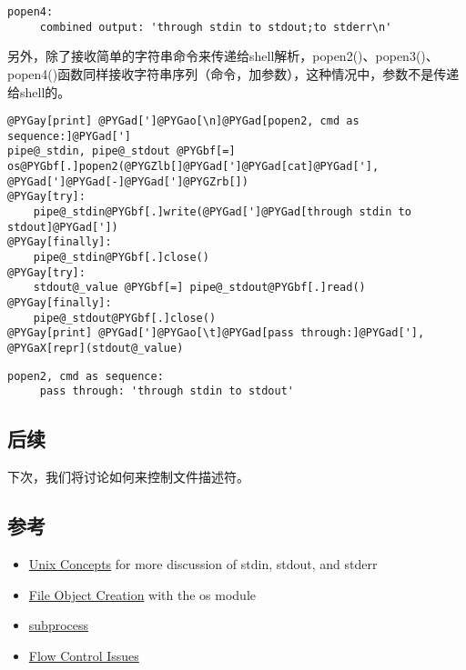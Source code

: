 \documentclass[letterpaper,10pt,english]{manual}
\begin{document}
\begin{Verbatim}[commandchars=@\[\]]
popen4:
     combined output: 'through stdin to stdout;to stderr\n'
\end{Verbatim}

另外，除了接收简单的字符串命令来传递给shell解析，popen2()、popen3()、popen4()函数同样接收字符串序列（命令，加参数），这种情况中，参数不是传递给shell的。

\begin{Verbatim}[commandchars=@\[\]]
@PYGay[print] @PYGad[']@PYGao[\n]@PYGad[popen2, cmd as sequence:]@PYGad[']
pipe@_stdin, pipe@_stdout @PYGbf[=] os@PYGbf[.]popen2(@PYGZlb[]@PYGad[']@PYGad[cat]@PYGad['], @PYGad[']@PYGad[-]@PYGad[']@PYGZrb[])
@PYGay[try]:
    pipe@_stdin@PYGbf[.]write(@PYGad[']@PYGad[through stdin to stdout]@PYGad['])
@PYGay[finally]:
    pipe@_stdin@PYGbf[.]close()
@PYGay[try]:
    stdout@_value @PYGbf[=] pipe@_stdout@PYGbf[.]read()
@PYGay[finally]:
    pipe@_stdout@PYGbf[.]close()
@PYGay[print] @PYGad[']@PYGao[\t]@PYGad[pass through:]@PYGad['], @PYGaX[repr](stdout@_value)
\end{Verbatim}

\begin{Verbatim}[commandchars=@\[\]]
popen2, cmd as sequence:
     pass through: 'through stdin to stdout'
\end{Verbatim}


\subsection{后续}

下次，我们将讨论如何来控制文件描述符。


\subsection{参考}
\begin{itemize}
\item {} 
\href{http://www.linuxhq.com/guides/LUG/node67.html}{Unix Concepts} for more discussion of stdin, stdout, and stderr

\item {} 
\href{http://docs.python.org/lib/os-newstreams.html}{File Object Creation} with the os module

\item {} 
\href{http://docs.python.org/lib/module-subprocess.html}{subprocess}

\item {} 
\href{http://docs.python.org/lib/popen2-flow-control.html}{Flow Control Issues}

\end{itemize}
\end{document}
